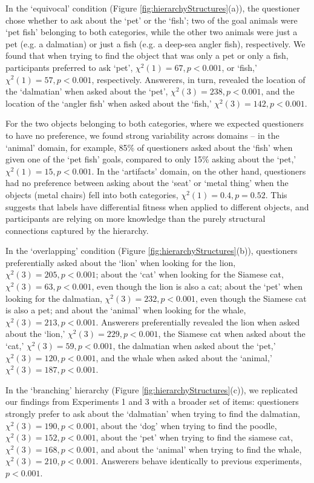 \documentclass[12pt, floatsintext, jou]{apa6}
\begin{document}
In the `equivocal' condition (Figure \ref{fig:hierarchyStructures}(a)), the questioner chose whether to ask about the `pet' or the `fish'; two of the goal animals were `pet fish' belonging to both categories, while the other two animals were just a pet (e.g. a dalmatian) or just a fish (e.g. a deep-sea angler fish), respectively. We found that when trying to find the object that was only a pet or only a fish, participants preferred to ask `pet', $\chi^2(1) = 67, p < 0.001$, or `fish,' $\chi^2(1) = 57, p < 0.001$, respectively. Answerers, in turn, revealed the location of the `dalmatian' when asked about the `pet', $\chi^2(3) = 238, p < 0.001$, and the location of the `angler fish' when asked about the `fish,' $\chi^2(3) = 142, p < 0.001$. 

For the two objects belonging to both categories, where we expected questioners to have no preference, we found strong variability across domains -- in the `animal' domain, for example, 85\% of questioners asked about the `fish' when given one of the `pet fish' goals, compared to only 15\% asking about the `pet,' $\chi^2(1) = 15, p < 0.001$. In the `artifacts' domain, on the other hand, questioners had no preference between asking about the `seat' or `metal thing' when the objects (metal chairs) fell into both categories, $\chi^2(1) = 0.4, p = 0.52$. This suggests that labels have differential fitness when applied to different objects, and participants are relying on more knowledge than the purely structural connections captured by the hierarchy. 

In the `overlapping' condition (Figure \ref{fig:hierarchyStructures}(b)), questioners preferentially asked about the `lion' when looking for the lion, $\chi^2(3) = 205, p < 0.001$; about the `cat' when looking for the Siamese cat, $\chi^2(3) = 63, p < 0.001$, even though the lion is also a cat; about the `pet' when looking for the dalmatian, $\chi^2(3) = 232, p < 0.001$, even though the Siamese cat is also a pet; and about the `animal' when looking for the whale, $\chi^2(3) = 213, p < 0.001$. Answerers preferentially revealed the lion when asked about the `lion,' $\chi^2(3) = 229, p < 0.001$, the Siamese cat when asked about the `cat,' $\chi^2(3) = 59, p < 0.001$, the dalmatian when asked about the `pet,' $\chi^2(3) = 120, p < 0.001$, and the whale when asked about the `animal,' $\chi^2(3) = 187, p < 0.001$. 

In the `branching' hierarchy (Figure \ref{fig:hierarchyStructures}(c)), we replicated our findings from Experiments 1 and 3 with a broader set of items: questioners strongly prefer to ask about the `dalmatian' when trying to find the dalmatian, $\chi^2(3) = 190, p < 0.001$, about the `dog' when trying to find the poodle, $\chi^2(3) = 152, p < 0.001$, about the `pet' when trying to find the siamese cat, $\chi^2(3) = 168, p < 0.001$, and about the `animal' when trying to find the whale, $\chi^2(3) = 210, p < 0.001$. Answerers behave identically to previous experiments, $p < 0.001$.
\end{document}
